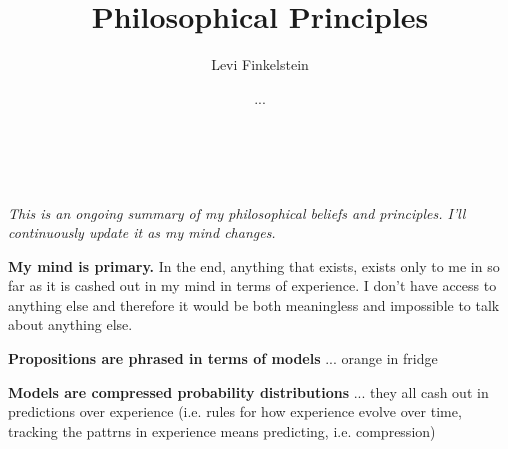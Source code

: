 \title{Philosophical Principles}
\author{Levi Finkelstein}
\date{...}


\maketitle
\\\\
\it{This is an ongoing summary of my philosophical beliefs and principles. I'll continuously update it as my mind changes.}
\par
\textbf{My mind is primary.} In the end, anything that exists, exists only to me in so far as it is cashed out in my mind in terms of experience. I don't have access to anything else and therefore it would be both meaningless and impossible to talk about anything else.
\par
\textbf{Propositions are phrased in terms of models} ... orange in fridge
\par
\textbf{Models are compressed probability distributions} ... they all cash out in predictions over experience (i.e. rules for how experience evolve over time, tracking the pattrns in experience means predicting, i.e. compression)
\par




